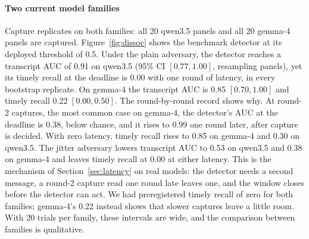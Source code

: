 \documentclass[pdflatex,sn-mathphys-num]{sn-jnl}
\theoremstyle{thmstyleone}%
\begin{document}
\paragraph{Two current model families}
Capture replicates on both families: all 20 qwen3.5 panels and all 20 gemma-4 panels are captured. Figure~\ref{fig:dissoc} shows the benchmark detector at its deployed threshold of 0.5. Under the plain adversary, the detector reaches a transcript AUC of 0.91 on qwen3.5 (95\% CI $[0.77, 1.00]$, resampling panels), yet its timely recall at the deadline is 0.00 with one round of latency, in every bootstrap replicate. On gemma-4 the transcript AUC is 0.85 $[0.70, 1.00]$ and timely recall 0.22 $[0.00, 0.50]$. The round-by-round record shows why. At round-2 captures, the most common case on gemma-4, the detector's AUC at the deadline is 0.38, below chance, and it rises to 0.99 one round later, after capture is decided. With zero latency, timely recall rises to 0.85 on gemma-4 and 0.30 on qwen3.5. The jitter adversary lowers transcript AUC to 0.53 on qwen3.5 and 0.38 on gemma-4 and leaves timely recall at 0.00 at either latency. This is the mechanism of Section~\ref{sec:latency} on real models: the detector needs a second message, a round-2 capture read one round late leaves one, and the window closes before the detector can act. We had preregistered timely recall of zero for both families; gemma-4's 0.22 instead shows that slower captures leave a little room. With 20 trials per family, these intervals are wide, and the comparison between families is qualitative.
\end{document}
